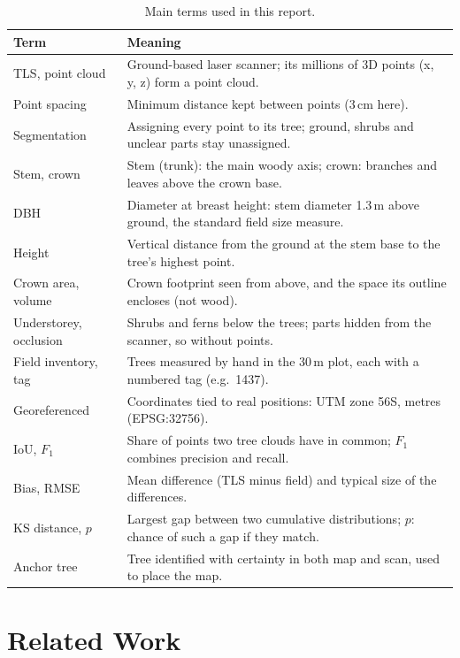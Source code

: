 \documentclass[runningheads]{llncs}
\begin{document}
\begin{table}[!tb]
\caption{Main terms used in this report.}\label{tab:glossary}
\centering\scriptsize
\begin{tabular}{@{}L{2.5cm}L{9.5cm}@{}}
\toprule
Term & Meaning\\
\midrule
TLS, point cloud & Ground-based laser scanner; its millions of 3D points (x, y, z) form a point cloud.\\
Point spacing & Minimum distance kept between points (3\,cm here).\\
Segmentation & Assigning every point to its tree; ground, shrubs and unclear parts stay unassigned.\\
Stem, crown & Stem (trunk): the main woody axis; crown: branches and leaves above the crown base.\\
DBH & Diameter at breast height: stem diameter 1.3\,m above ground, the standard field size measure.\\
Height & Vertical distance from the ground at the stem base to the tree's highest point.\\
Crown area, volume & Crown footprint seen from above, and the space its outline encloses (not wood).\\
Understorey, occlusion & Shrubs and ferns below the trees; parts hidden from the scanner, so without points.\\
Field inventory, tag & Trees measured by hand in the 30\,m plot, each with a numbered tag (e.g.\ 1437).\\
Georeferenced & Coordinates tied to real positions: UTM zone 56S, metres (EPSG:32756).\\
IoU, $F_1$ & Share of points two tree clouds have in common; $F_1$ combines precision and recall.\\
Bias, RMSE & Mean difference (TLS minus field) and typical size of the differences.\\
KS distance, $p$ & Largest gap between two cumulative distributions; $p$: chance of such a gap if they match.\\
Anchor tree & Tree identified with certainty in both map and scan, used to place the map.\\
\bottomrule
\end{tabular}
\end{table}

\section{Related Work}\label{sec:related}
\end{document}
